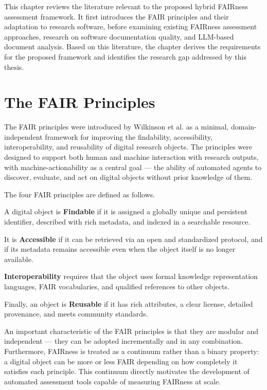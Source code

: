 This chapter reviews the literature relevant to the proposed hybrid
FAIRness assessment framework. It first introduces the FAIR principles
and their adaptation to research software, before examining existing
FAIRness assessment approaches, research on software documentation
quality, and LLM-based document analysis. Based on this literature,
the chapter derives the requirements for the proposed framework and
identifies the research gap addressed by this thesis.
\section{The FAIR Principles}

The FAIR principles were introduced by Wilkinson et al. 
\cite{wilkinson2016fair} as a minimal, domain-independent framework 
for improving the findability, accessibility, interoperability, and 
reusability of digital research objects. The principles were designed 
to support both human and machine interaction with research outputs, 
with machine-actionability as a central goal — the ability of 
automated agents to discover, evaluate, and act on digital objects 
without prior knowledge of them.

The four FAIR principles are defined as follows.

A digital object is \textbf{Findable} if it is assigned a globally 
unique and persistent identifier, described with rich metadata, and 
indexed in a searchable resource.

It is \textbf{Accessible} if it can be retrieved via an open and 
standardized protocol, and if its metadata remains accessible even 
when the object itself is no longer available.

\textbf{Interoperability} requires that the object uses formal 
knowledge representation languages, FAIR vocabularies, and qualified 
references to other objects.

Finally, an object is \textbf{Reusable} if it has rich attributes, 
a clear license, detailed provenance, and meets community standards.

An important characteristic of the FAIR principles is that they are 
modular and independent — they can be adopted incrementally and in 
any combination. Furthermore, FAIRness is treated as a continuum 
rather than a binary property: a digital object can be more or less 
FAIR depending on how completely it satisfies each principle. This 
continuum directly motivates the development of automated assessment 
tools capable of measuring FAIRness at scale.

